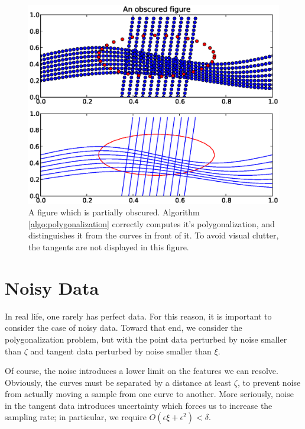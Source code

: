 \documentclass{article}
\numberwithin{cntr}{section}
\numberwithin{equation}{section}
\newcommand{\curvesep}{{\delta}}
\newcommand{\pointNoise}{{\zeta}}
\newcommand{\tanNoise}{{\xi}}
\begin{document}
\begin{figure}
\setlength{\unitlength}{0.240900pt}
\ifx\plotpoint\undefined\newsavebox{\plotpoint}\fi
\sbox{\plotpoint}{\rule[-0.200pt]{0.400pt}{0.400pt}}%
\includegraphics[scale=0.5]{obscured_figure.eps}

\caption{A figure which is partially obscured. Algorithm \ref{algo:polygonalization} correctly computes it's polygonalization, and distinguishes it from the curves in front of it. To avoid visual clutter, the tangents are not displayed in this figure.}
\label{fig:obscuredExample}
\end{figure}

\section{Noisy Data}

In real life, one rarely has perfect data. For this reason, it is important to consider the case of noisy data. Toward that end, we consider the polygonalization problem, but with the point data perturbed by noise smaller than $\pointNoise$ and tangent data perturbed by noise smaller than $\tanNoise$.

Of course, the noise introduces a lower limit on the features we can resolve. Obviously, the curves must be separated by a distance at least $\pointNoise$, to prevent noise from actually moving a sample from one curve to another. More seriously, noise in the tangent data introduces uncertainty which forces us to increase the sampling rate; in particular, we require $O(\epsilon \tanNoise + \epsilon^{2}) < \curvesep$.
\end{document}
